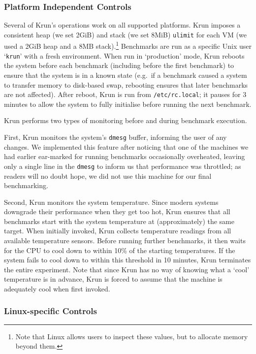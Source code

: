 \documentclass[a4paper,UKenglish]{lipics}
\newcommand{\krun}{Krun\xspace}
\begin{document}
\subsubsection{Platform Independent Controls}

Several of \krun's operations work on all supported platforms. \krun imposes a
consistent heap (we set 2GiB) and stack (we set 8MiB) \texttt{ulimit} for each
VM (we used a 2GiB heap and a 8MB stack).\footnote{Note that Linux allows users
to inspect these values, but to allocate memory beyond them.} Benchmarks are run
as a specific Unix user `\texttt{krun}' with a fresh environment. When run in
`production' mode, \krun reboots the system before each benchmark (including
before the first benchmark) to ensure that the system is in a known state
(e.g.~if a benchmark caused a system to transfer memory to disk-based swap,
rebooting ensures that later benchmarks are not affected). After reboot, \krun
is run from \texttt{/etc/rc.local}; it pauses for 3 minutes to allow the system
to fully initialise before running the next benchmark.

\krun performs two types of monitoring before and during benchmark execution.

First, \krun monitors the system's \texttt{dmesg} buffer, informing the user of
any changes. We implemented this feature after noticing that one of the
machines we had earlier ear-marked for running benchmarks occasionally
overheated, leaving only a single line in the \texttt{dmesg} to inform us that
performance was throttled; as
readers will no doubt hope, we did not use this machine for our final
benchmarking.

Second, \krun monitors the system temperature. Since modern systems downgrade
their performance when they get too hot, \krun ensures that all benchmarks
start with the system temperature at (approximately) the same target. When
initially invoked, \krun collects temperature readings from all available
temperature sensors. Before running
further benchmarks, it then waits for the CPU to cool down to within 10\%{} of
the starting temperatures. If the system fails to cool down to within
this threshold in 10 minutes, \krun terminates the entire experiment. Note that
since \krun has no way of knowing what a `cool' temperature is in advance,
\krun is forced to assume that the machine is adequately cool when first invoked.


\subsubsection{Linux-specific Controls}
\end{document}
